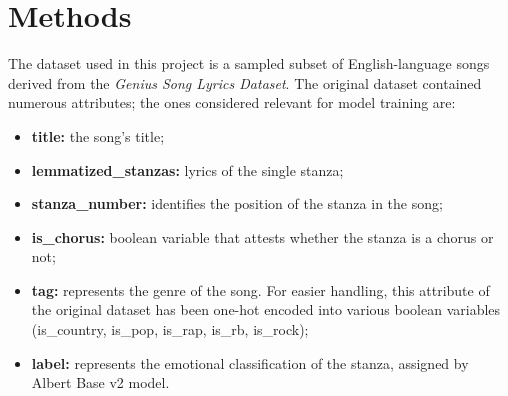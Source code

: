 \chapter{Methods}
\label{ch:capitolo2}


The dataset used in this project is a sampled subset of English-language
songs derived from the \textit{Genius Song Lyrics Dataset}\textsuperscript{\cite{geniusdataset}}.
The original dataset contained numerous attributes; the ones considered
relevant for model training are:
\begin{itemize}
    \item \textbf{title:} the song's title;

    \item \textbf{lemmatized\_stanzas:} lyrics of the single stanza;
    
    \item \textbf{stanza\_number:} identifies the position of the stanza in the song;

    \item \textbf{is\_chorus:} boolean variable that attests whether the stanza is
        a chorus or not;
    
    \item \textbf{tag:} represents the genre of the song. For easier handling,
        this attribute of the original dataset has been one-hot encoded into various boolean variables
        (is\_country, is\_pop, is\_rap, is\_rb, is\_rock);

    \item \textbf{label:} represents the emotional classification of the stanza,
        assigned by Albert Base v2\textsuperscript{\cite{albert-base-v2}} model.
    
\end{itemize}

